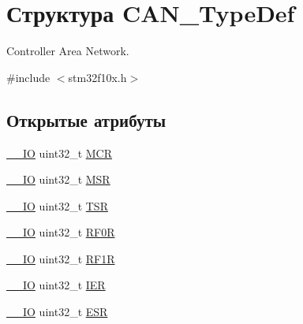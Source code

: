 \hypertarget{struct_c_a_n___type_def}{}\section{Структура C\+A\+N\+\_\+\+Type\+Def}
\label{struct_c_a_n___type_def}


Controller Area Network.  




{\ttfamily \#include $<$stm32f10x.\+h$>$}

\subsection*{Открытые атрибуты}
\begin{DoxyCompactItemize}
\item 
\mbox{\hyperlink{group___c_m_s_i_s___c_m3__core__definitions_gaec43007d9998a0a0e01faede4133d6be}{\+\_\+\+\_\+\+IO}} uint32\+\_\+t \mbox{\hyperlink{struct_c_a_n___type_def_a1282eee79a22003257a7a5daa7f4a35f}{M\+CR}}
\item 
\mbox{\hyperlink{group___c_m_s_i_s___c_m3__core__definitions_gaec43007d9998a0a0e01faede4133d6be}{\+\_\+\+\_\+\+IO}} uint32\+\_\+t \mbox{\hyperlink{struct_c_a_n___type_def_af98b957a4e887751fbd407d3e2cf93b5}{M\+SR}}
\item 
\mbox{\hyperlink{group___c_m_s_i_s___c_m3__core__definitions_gaec43007d9998a0a0e01faede4133d6be}{\+\_\+\+\_\+\+IO}} uint32\+\_\+t \mbox{\hyperlink{struct_c_a_n___type_def_acbc82ac4e87e75350fc586be5e56d95b}{T\+SR}}
\item 
\mbox{\hyperlink{group___c_m_s_i_s___c_m3__core__definitions_gaec43007d9998a0a0e01faede4133d6be}{\+\_\+\+\_\+\+IO}} uint32\+\_\+t \mbox{\hyperlink{struct_c_a_n___type_def_ad8e858479e26ab075ee2ddb630e8769d}{R\+F0R}}
\item 
\mbox{\hyperlink{group___c_m_s_i_s___c_m3__core__definitions_gaec43007d9998a0a0e01faede4133d6be}{\+\_\+\+\_\+\+IO}} uint32\+\_\+t \mbox{\hyperlink{struct_c_a_n___type_def_a69a528d1288c1de666df68655af1d20e}{R\+F1R}}
\item 
\mbox{\hyperlink{group___c_m_s_i_s___c_m3__core__definitions_gaec43007d9998a0a0e01faede4133d6be}{\+\_\+\+\_\+\+IO}} uint32\+\_\+t \mbox{\hyperlink{struct_c_a_n___type_def_a530babbc4b9584c93a1bf87d6ce8b8dc}{I\+ER}}
\item 
\mbox{\hyperlink{group___c_m_s_i_s___c_m3__core__definitions_gaec43007d9998a0a0e01faede4133d6be}{\+\_\+\+\_\+\+IO}} uint32\+\_\+t \mbox{\hyperlink{struct_c_a_n___type_def_ab1a1b6a7c587443a03d654d3b9a94423}{E\+SR}}

\end{DoxyCompactItemize}
